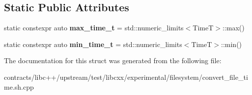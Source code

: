 \subsection*{Static Public Attributes}
\begin{DoxyCompactItemize}
\item 
\mbox{\label{structcheck__is__representable_3_01_file_time_t_00_01_time_t_00_01_time_spec_t_00_01_base_00_01_t_k__64_bit_01_4_ac939668bbd49916346c2594506cb57cf}} 
static constexpr auto {\bfseries max\+\_\+time\+\_\+t} = std\+::numeric\+\_\+limits$<$TimeT$>$\+::max()
\item 
\mbox{\label{structcheck__is__representable_3_01_file_time_t_00_01_time_t_00_01_time_spec_t_00_01_base_00_01_t_k__64_bit_01_4_aeda30c946306bcc1ab5e391b24a1e769}} 
static constexpr auto {\bfseries min\+\_\+time\+\_\+t} = std\+::numeric\+\_\+limits$<$TimeT$>$\+::min()
\end{DoxyCompactItemize}


The documentation for this struct was generated from the following file\+:\begin{DoxyCompactItemize}
\item 
contracts/libc++/upstream/test/libcxx/experimental/filesystem/convert\+\_\+file\+\_\+time.\+sh.\+cpp\end{DoxyCompactItemize}
